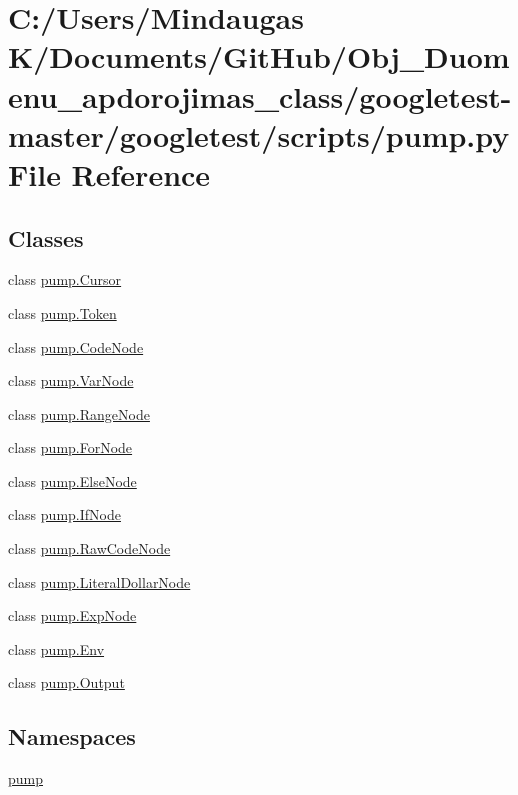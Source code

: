 \hypertarget{googletest-master_2googletest_2scripts_2pump_8py}{}\section{C\+:/\+Users/\+Mindaugas K/\+Documents/\+Git\+Hub/\+Obj\+\_\+\+Duomenu\+\_\+apdorojimas\+\_\+class/googletest-\/master/googletest/scripts/pump.py File Reference}
\label{googletest-master_2googletest_2scripts_2pump_8py}
\subsection*{Classes}
\begin{DoxyCompactItemize}
\item 
class \mbox{\hyperlink{classpump_1_1_cursor}{pump.\+Cursor}}
\item 
class \mbox{\hyperlink{classpump_1_1_token}{pump.\+Token}}
\item 
class \mbox{\hyperlink{classpump_1_1_code_node}{pump.\+Code\+Node}}
\item 
class \mbox{\hyperlink{classpump_1_1_var_node}{pump.\+Var\+Node}}
\item 
class \mbox{\hyperlink{classpump_1_1_range_node}{pump.\+Range\+Node}}
\item 
class \mbox{\hyperlink{classpump_1_1_for_node}{pump.\+For\+Node}}
\item 
class \mbox{\hyperlink{classpump_1_1_else_node}{pump.\+Else\+Node}}
\item 
class \mbox{\hyperlink{classpump_1_1_if_node}{pump.\+If\+Node}}
\item 
class \mbox{\hyperlink{classpump_1_1_raw_code_node}{pump.\+Raw\+Code\+Node}}
\item 
class \mbox{\hyperlink{classpump_1_1_literal_dollar_node}{pump.\+Literal\+Dollar\+Node}}
\item 
class \mbox{\hyperlink{classpump_1_1_exp_node}{pump.\+Exp\+Node}}
\item 
class \mbox{\hyperlink{classpump_1_1_env}{pump.\+Env}}
\item 
class \mbox{\hyperlink{classpump_1_1_output}{pump.\+Output}}
\end{DoxyCompactItemize}
\subsection*{Namespaces}
\begin{DoxyCompactItemize}
\item 
 \mbox{\hyperlink{namespacepump}{pump}}
\end{DoxyCompactItemize}
